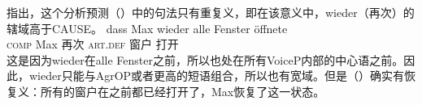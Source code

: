 
 \citet{JB2003a-u}指出，这个分析预测（）中的句法只有重复义，即在该意义中，wieder（再次）的辖域高于CAUSE。
\ea
\label{ex-wieder-alle}
\gll dass Max wieder alle Fenster öffnete\\
    \textsc{comp} Max 再次 \textsc{art}.\textsc{def} 窗户 打开\\
\z
这是因为wieder在alle Fenster之前，所以也处在所有VoiceP内部的中心语之前。因此，wieder只能与AgrOP或者更高的短语组合，所以也有宽域。但是（）确实有恢复义：所有的窗户在之前都已经打开了，Max恢复了这一状态。

